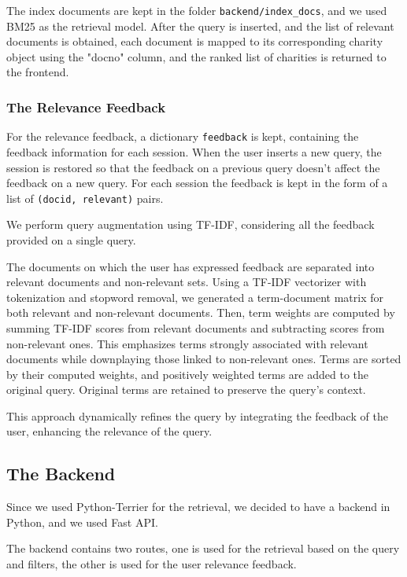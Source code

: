 \documentclass[unicode,9pt,a4paper,oneside,numbers=endperiod,openany]{scrartcl}
\begin{document}
The index documents are kept in the folder \texttt{backend/index\_docs}, and we used BM25 as the retrieval model. After the query is inserted, and the list of relevant documents is obtained, each document is mapped to its corresponding charity object using the "docno" column, and the ranked list of charities is returned to the frontend.

\subsubsection{The Relevance Feedback}

For the relevance feedback, a dictionary \texttt{feedback} is kept, containing the feedback information for each session. When the user inserts a new query, the session is restored so that the feedback on a previous query doesn't affect the feedback on a new query.
For each session the feedback is kept in the form of a list of  \texttt{(docid, relevant)} pairs.

We perform query augmentation using TF-IDF, considering all the feedback provided on a single query.

The documents on which the user has expressed feedback are separated into relevant documents and non-relevant sets. Using a TF-IDF vectorizer with tokenization and stopword removal, we generated a term-document matrix for both relevant and non-relevant documents.
Then, term weights are computed by summing TF-IDF scores from relevant documents and subtracting scores from non-relevant ones. This emphasizes terms strongly associated with relevant documents while downplaying those linked to non-relevant ones.
Terms are sorted by their computed weights, and positively weighted terms are added to the original query. Original terms are retained to preserve the query's context.

This approach dynamically refines the query by integrating the feedback of the user, enhancing the relevance of the query.



\subsection{The Backend}

Since we used Python-Terrier for the retrieval, we decided to have a backend in Python, and we used Fast API.

The backend contains two routes, one is used for the retrieval based on the query and filters, the other is used for the user relevance feedback.
\end{document}
